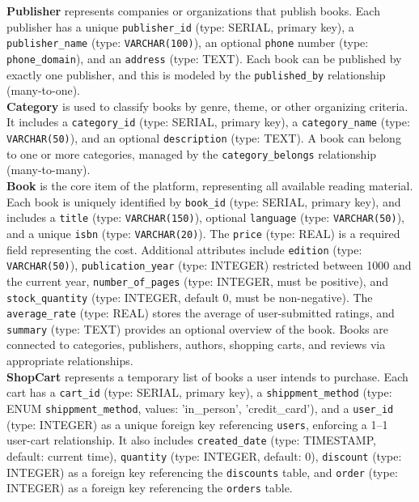 \textbf{Publisher} represents companies or organizations that publish books. Each publisher has a unique \texttt{publisher\_id} (type: SERIAL, primary key), a \texttt{publisher\_name} (type: \texttt{VARCHAR(100)}), an optional \texttt{phone} number (type: \texttt{phone\_domain}), and an \texttt{address} (type: TEXT). Each book can be published by exactly one publisher, and this is modeled by the \texttt{published\_by} relationship (many-to-one).\\

\textbf{Category} is used to classify books by genre, theme, or other organizing criteria. It includes a \texttt{category\_id} (type: SERIAL, primary key), a \texttt{category\_name} (type: \texttt{VARCHAR(50)}), and an optional \texttt{description} (type: TEXT). A book can belong to one or more categories, managed by the \texttt{category\_belongs} relationship (many-to-many).\\

\textbf{Book} is the core item of the platform, representing all available reading material. Each book is uniquely identified by \texttt{book\_id} (type: SERIAL, primary key), and includes a \texttt{title} (type: \texttt{VARCHAR(150)}), optional \texttt{language} (type: \texttt{VARCHAR(50)}), and a unique \texttt{isbn} (type: \texttt{VARCHAR(20)}). The \texttt{price} (type: REAL) is a required field representing the cost. Additional attributes include \texttt{edition} (type: \texttt{VARCHAR(50)}), \texttt{publication\_year} (type: INTEGER) restricted between 1000 and the current year, \texttt{number\_of\_pages} (type: INTEGER, must be positive), and \texttt{stock\_quantity} (type: INTEGER, default 0, must be non-negative). The \texttt{average\_rate} (type: REAL) stores the average of user-submitted ratings, and \texttt{summary} (type: TEXT) provides an optional overview of the book. Books are connected to categories, publishers, authors, shopping carts, and reviews via appropriate relationships.\\


\textbf{ShopCart} represents a temporary list of books a user intends to purchase. Each cart has a \texttt{cart\_id} (type: SERIAL, primary key), a \texttt{shippment\_method} (type: ENUM \texttt{shippment\_method}, values: 'in\_person', 'credit\_card'), and a \texttt{user\_id} (type: INTEGER) as a unique foreign key referencing \texttt{users}, enforcing a 1–1 user-cart relationship. It also includes \texttt{created\_date} (type: TIMESTAMP, default: current time), \texttt{quantity} (type: INTEGER, default: 0), \texttt{discount} (type: INTEGER) as a foreign key referencing the \texttt{discounts} table, and \texttt{order} (type: INTEGER) as a foreign key referencing the \texttt{orders} table.\\

